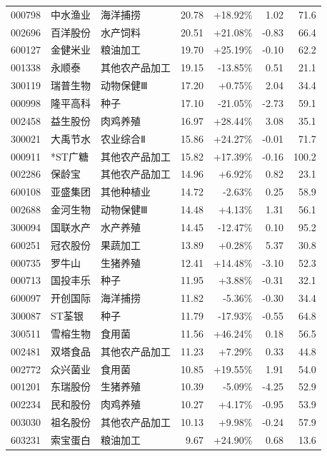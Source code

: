 \begin{longtable}{@{}llp{2.4cm}rrrr@{}}
000798 & 中水渔业 & 海洋捕捞 & 20.78 & +18.92\% & 1.02 & 71.6 \\
002696 & 百洋股份 & 水产饲料 & 20.51 & +21.08\% & -0.83 & 66.4 \\
600127 & 金健米业 & 粮油加工 & 19.70 & +25.19\% & -0.10 & 62.2 \\
001338 & 永顺泰 & 其他农产品加工 & 19.15 & -13.85\% & 0.51 & 21.1 \\
300119 & 瑞普生物 & 动物保健Ⅲ & 17.20 & +0.75\% & 2.04 & 34.4 \\
000998 & 隆平高科 & 种子 & 17.10 & -21.05\% & -2.73 & 59.1 \\
002458 & 益生股份 & 肉鸡养殖 & 16.97 & +28.44\% & 3.08 & 35.1 \\
300021 & 大禹节水 & 农业综合Ⅱ & 15.86 & +24.27\% & -0.01 & 71.7 \\
000911 & *ST广糖 & 其他农产品加工 & 15.82 & +17.39\% & -0.16 & 100.2 \\
002286 & 保龄宝 & 其他农产品加工 & 14.96 & +6.92\% & 0.82 & 23.1 \\
600108 & 亚盛集团 & 其他种植业 & 14.72 & -2.63\% & 0.25 & 58.9 \\
002688 & 金河生物 & 动物保健Ⅲ & 14.48 & +4.13\% & 1.31 & 56.1 \\
300094 & 国联水产 & 水产养殖 & 14.45 & -12.47\% & 0.10 & 95.2 \\
600251 & 冠农股份 & 果蔬加工 & 13.89 & +0.28\% & 5.37 & 30.8 \\
000735 & 罗牛山 & 生猪养殖 & 12.41 & +14.48\% & -3.10 & 52.3 \\
000713 & 国投丰乐 & 种子 & 11.95 & +3.88\% & -0.31 & 32.1 \\
600097 & 开创国际 & 海洋捕捞 & 11.82 & -5.36\% & -0.30 & 34.4 \\
300087 & ST荃银 & 种子 & 11.79 & -17.93\% & -0.55 & 64.8 \\
300511 & 雪榕生物 & 食用菌 & 11.56 & +46.24\% & 0.18 & 56.5 \\
002481 & 双塔食品 & 其他农产品加工 & 11.23 & +7.29\% & 0.33 & 44.8 \\
002772 & 众兴菌业 & 食用菌 & 10.85 & +19.55\% & 1.91 & 54.0 \\
001201 & 东瑞股份 & 生猪养殖 & 10.39 & -5.09\% & -4.25 & 52.9 \\
002234 & 民和股份 & 肉鸡养殖 & 10.27 & +4.17\% & -0.95 & 53.9 \\
003030 & 祖名股份 & 其他农产品加工 & 10.13 & +9.98\% & -0.24 & 57.9 \\
603231 & 索宝蛋白 & 粮油加工 & 9.67 & +24.90\% & 0.68 & 13.6 \\

\end{longtable}
